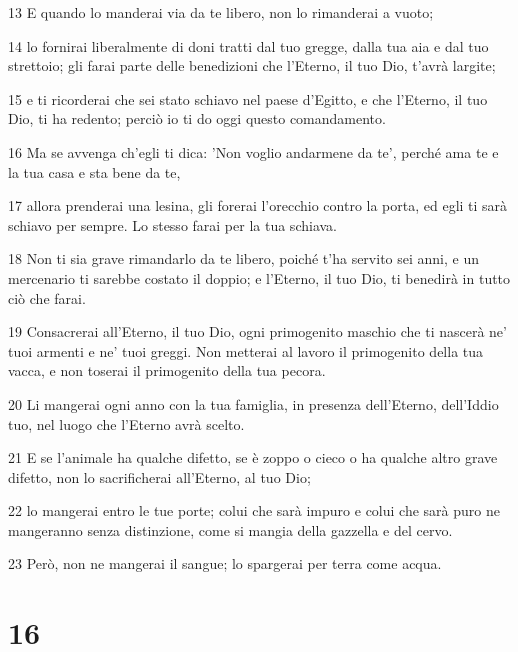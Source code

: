 \par 13 E quando lo manderai via da te libero, non lo rimanderai a vuoto;
\par 14 lo fornirai liberalmente di doni tratti dal tuo gregge, dalla tua aia e dal tuo strettoio; gli farai parte delle benedizioni che l'Eterno, il tuo Dio, t'avrà largite;
\par 15 e ti ricorderai che sei stato schiavo nel paese d'Egitto, e che l'Eterno, il tuo Dio, ti ha redento; perciò io ti do oggi questo comandamento.
\par 16 Ma se avvenga ch'egli ti dica: 'Non voglio andarmene da te', perché ama te e la tua casa e sta bene da te,
\par 17 allora prenderai una lesina, gli forerai l'orecchio contro la porta, ed egli ti sarà schiavo per sempre. Lo stesso farai per la tua schiava.
\par 18 Non ti sia grave rimandarlo da te libero, poiché t'ha servito sei anni, e un mercenario ti sarebbe costato il doppio; e l'Eterno, il tuo Dio, ti benedirà in tutto ciò che farai.
\par 19 Consacrerai all'Eterno, il tuo Dio, ogni primogenito maschio che ti nascerà ne' tuoi armenti e ne' tuoi greggi. Non metterai al lavoro il primogenito della tua vacca, e non toserai il primogenito della tua pecora.
\par 20 Li mangerai ogni anno con la tua famiglia, in presenza dell'Eterno, dell'Iddio tuo, nel luogo che l'Eterno avrà scelto.
\par 21 E se l'animale ha qualche difetto, se è zoppo o cieco o ha qualche altro grave difetto, non lo sacrificherai all'Eterno, al tuo Dio;
\par 22 lo mangerai entro le tue porte; colui che sarà impuro e colui che sarà puro ne mangeranno senza distinzione, come si mangia della gazzella e del cervo.
\par 23 Però, non ne mangerai il sangue; lo spargerai per terra come acqua.

\chapter{16}

